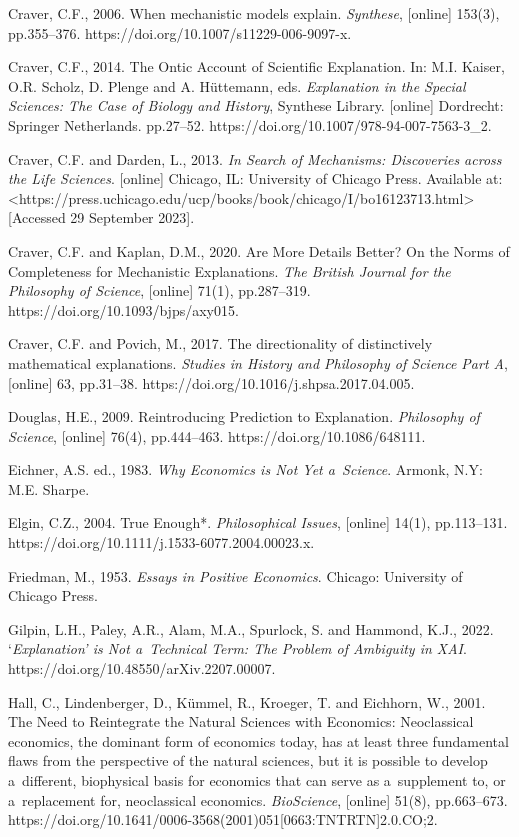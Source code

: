 Craver, C.F., 2006. When mechanistic models explain. \textit{Synthese}, [online] 153(3), pp.355–376. https://doi.org/10.1007/s11229-006-9097-x.

Craver, C.F., 2014. The Ontic Account of Scientific Explanation. In: M.I. Kaiser, O.R. Scholz, D. Plenge and A. Hüttemann, eds. \textit{Explanation in the Special Sciences: The Case of Biology and History}, Synthese Library. [online] Dordrecht: Springer Netherlands. pp.27–52. https://doi.org/10.1007/978-94-007-7563-3\_2.

Craver, C.F. and Darden, L., 2013. \textit{In Search of Mechanisms: Discoveries across the Life Sciences}. [online] Chicago, IL: University of Chicago Press. Available at: {\textless}https://press.uchicago.edu/ucp/books/book/chicago/I/bo16123713.html{\textgreater} [Accessed 29 September 2023].

Craver, C.F. and Kaplan, D.M., 2020. Are More Details Better? On the Norms of Completeness for Mechanistic Explanations. \textit{The British Journal for the Philosophy of Science}, [online] 71(1), pp.287–319. https://doi.org/10.1093/bjps/axy015.

Craver, C.F. and Povich, M., 2017. The directionality of distinctively mathematical explanations. \textit{Studies in History and Philosophy of Science Part A}, [online] 63, pp.31–38. https://doi.org/10.1016/j.shpsa.2017.04.005.

Douglas, H.E., 2009. Reintroducing Prediction to Explanation. \textit{Philosophy of Science}, [online] 76(4), pp.444–463. https://doi.org/10.1086/648111.

Eichner, A.S. ed., 1983. \textit{Why Economics is Not Yet a~Science}. Armonk, N.Y: M.E. Sharpe.

Elgin, C.Z., 2004. True Enough*. \textit{Philosophical Issues}, [online] 14(1), pp.113–131. https://doi.org/10.1111/j.1533-6077.2004.00023.x.

Friedman, M., 1953. \textit{Essays in Positive Economics}. Chicago: University of Chicago Press.

Gilpin, L.H., Paley, A.R., Alam, M.A., Spurlock, S. and Hammond, K.J., 2022. ‘\textit{Explanation' is Not a~Technical Term: The Problem of Ambiguity in XAI}. https://doi.org/10.48550/arXiv.2207.00007.

Hall, C., Lindenberger, D., Kümmel, R., Kroeger, T. and Eichhorn, W., 2001. The Need to Reintegrate the Natural Sciences with Economics: Neoclassical economics, the dominant form of economics today, has at least three fundamental flaws from the perspective of the natural sciences, but it is possible to develop a~different, biophysical basis for economics that can serve as a~supplement to, or a~replacement for, neoclassical economics. \textit{BioScience}, [online] 51(8), pp.663–673. https://doi.org/10.1641/0006-3568(2001)051[0663:TNTRTN]2.0.CO;2.

